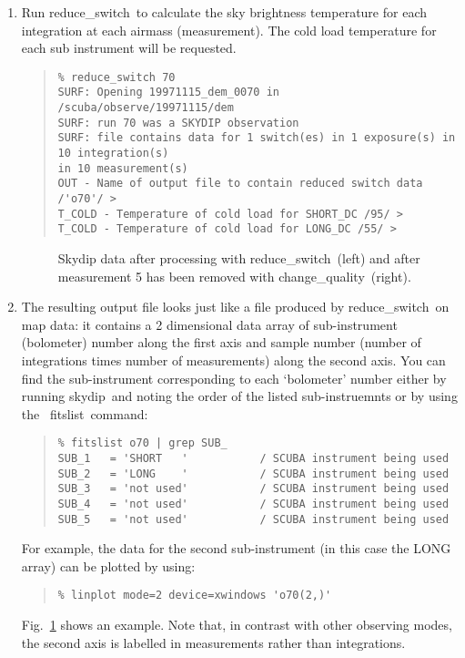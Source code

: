\documentclass[twoside,11pt]{article}
\newcommand{\Kappa}{\xref{{\sc{Kappa}}}{sun95}{}}
\newcommand{\task}[1]{{\sf #1}}
\newcommand{\chgqual}{\htmlref{\task{change\_quality}}{CHANGE_QUALITY}}
\newcommand{\resw}{\htmlref{\task{reduce\_switch}}{REDUCE_SWITCH}}
\newcommand{\skydip}{\htmlref{\task{skydip}}{SKYDIP}}
\newcommand{\fitslist}{\xref{\task{fitslist}}{sun95}{FITSLIST}}
\newenvironment{myquote}{\begin{quote}\begin{small}}{\end{small}\end{quote}}
\newcommand{\htmlref}[2]{#1}
\newcommand{\xref}[3]{#1}
\begin{document}
\begin{enumerate}

\item Run \resw\ to calculate the sky brightness temperature for each
integration at each airmass (measurement). The cold load temperature for each
sub instrument will be requested.
\begin{myquote}
\begin{verbatim}
% reduce_switch 70
SURF: Opening 19971115_dem_0070 in /scuba/observe/19971115/dem
SURF: run 70 was a SKYDIP observation
SURF: file contains data for 1 switch(es) in 1 exposure(s) in 10 integration(s)
in 10 measurement(s)
OUT - Name of output file to contain reduced switch data /'o70'/ > 
T_COLD - Temperature of cold load for SHORT_DC /95/ > 
T_COLD - Temperature of cold load for LONG_DC /55/ > 
\end{verbatim}
\end{myquote}


\begin{figure}
\begin{center}
\caption{Skydip data after processing with \resw\ (left) and after measurement 
5 has been removed with \chgqual\ (right).}
\label{rawsdip}
\end{center}
\end{figure}



\item The resulting output file looks just like a file produced by \resw\ on
map data: it contains a 2 dimensional data array of sub-instrument (bolometer)
number along the first axis and sample number (number of integrations times
number of measurements) along the second axis. You can find the sub-instrument corresponding to each `bolometer' 
number either by running \skydip\ and noting the order of the listed
sub-instruemnts or by using the \Kappa\ \fitslist\ command:
\begin{myquote}
\begin{verbatim}
% fitslist o70 | grep SUB_
SUB_1   = 'SHORT   '           / SCUBA instrument being used
SUB_2   = 'LONG    '           / SCUBA instrument being used
SUB_3   = 'not used'           / SCUBA instrument being used
SUB_4   = 'not used'           / SCUBA instrument being used
SUB_5   = 'not used'           / SCUBA instrument being used
\end{verbatim}
\end{myquote}
For example, the data for the
second  sub-instrument (in this case the LONG array) can be plotted by using:
\begin{myquote}
\begin{verbatim}
% linplot mode=2 device=xwindows 'o70(2,)'
\end{verbatim}
\end{myquote}
Fig.\ \ref{rawsdip} shows an example. Note that, in contrast with 
other observing modes, the second axis is labelled in measurements rather than
integrations.




\end{enumerate}
\end{document}
